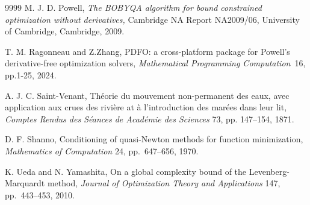 \documentclass{article}
\begin{document}
\begin{thebibliography}{9999}
 {M. J. D. Powell,} \textit{The BOBYQA
 algorithm for bound constrained optimization without derivatives,} Cambridge NA Report NA2009/06, University of Cambridge, Cambridge, 2009.

 T. M. Ragonneau and Z.Zhang, 
PDFO: a cross-platform package for Powell’s derivative-free optimization solvers, {\it Mathematical Programming Computation}~16,
  pp.1-25, 2024.

 
 

%


 A. J. C. Saint-Venant, Th\'eorie du mouvement
non-permanent des eaux, avec application aux crues des rivi\`ere at
\`a l'introduction des mar\'ees dans leur lit, \textit{Comptes
Rendus des S\'eances de Acad\'emie des Sciences} 73, pp. 147--154, 1871.

 D. F. Shanno, Conditioning of quasi-Newton methods for function
 minimization, {\it Mathematics of Computation} 24, pp.~647--656, 1970.

 K. Ueda and N. Yamashita, On a global complexity bound of the
 Levenberg-Marquardt method, {\it Journal of Optimization Theory and Applications} 147,
 pp.~443--453, 2010.














\end{thebibliography}
\end{document}
